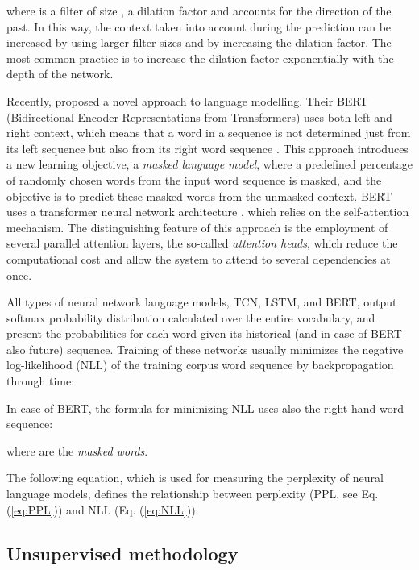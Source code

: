 \documentclass{clv3}
\begin{document}
 where  is a filter of size ,  a dilation factor and  accounts for the direction of the past. In this way, the context taken into account during the prediction can be increased by using larger filter sizes and by increasing the dilation factor. The most common practice is to increase the dilation factor exponentially with the depth of the network.

Recently,  \citet{devlin2018bert} proposed a novel approach to language modelling. Their BERT (Bidirectional Encoder Representations from Transformers) uses both left and right context, which means that a word  in a sequence is not determined just from its left sequence  but also from its right word sequence . This approach introduces a new learning objective, a \textit{masked language model}, where a predefined percentage of randomly chosen words from the input word sequence is masked, and the objective is to predict these masked words from the unmasked context. BERT uses a transformer neural network architecture \citep{vaswani2017attention}, which relies on the self-attention mechanism. The distinguishing feature of this approach is the employment of several parallel attention layers, the so-called \textit{attention heads}, which reduce the computational cost and allow the system to attend to several dependencies at once.

All types of neural network language models, TCN, LSTM, and BERT, output softmax probability distribution calculated over the entire vocabulary, and present the probabilities for each word given its historical (and in case of BERT also future) sequence. Training of these networks usually minimizes the negative log-likelihood (NLL) of the training corpus word sequence  by backpropagation through time:

In case of BERT, the formula for minimizing NLL uses also the right-hand  word sequence:

where  are the \textit{masked words}. 

The following equation, which is used for measuring the perplexity of neural language models, defines the relationship between perplexity (PPL, see Eq. (\ref{eq:PPL})) and NLL (Eq. (\ref{eq:NLL})):




\subsection{Unsupervised methodology}
\label{sec-methodology-unsupervised}
\end{document}
